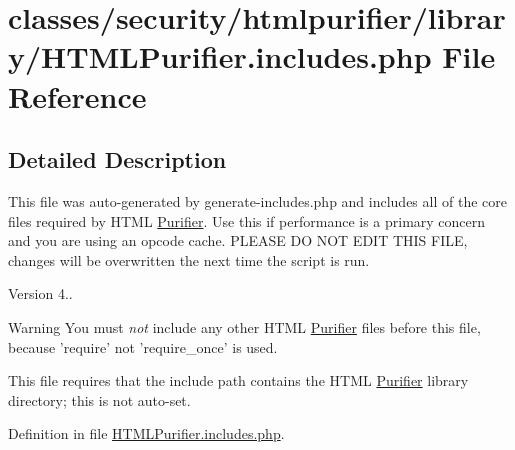 \hypertarget{HTMLPurifier_8includes_8php}{\section{classes/security/htmlpurifier/library/\+H\+T\+M\+L\+Purifier.includes.\+php File Reference}
\label{HTMLPurifier_8includes_8php}
}


\subsection{Detailed Description}
This file was auto-\/generated by generate-\/includes.\+php and includes all of the core files required by H\+T\+M\+L \hyperlink{classPurifier}{Purifier}. Use this if performance is a primary concern and you are using an opcode cache. P\+L\+E\+A\+S\+E D\+O N\+O\+T E\+D\+I\+T T\+H\+I\+S F\+I\+L\+E, changes will be overwritten the next time the script is run.

\begin{DoxyVersion}{Version}
4..
\end{DoxyVersion}
\begin{DoxyWarning}{Warning}
You must {\itshape not} include any other H\+T\+M\+L \hyperlink{classPurifier}{Purifier} files before this file, because 'require' not 'require\+\_\+once' is used.

This file requires that the include path contains the H\+T\+M\+L \hyperlink{classPurifier}{Purifier} library directory; this is not auto-\/set. 
\end{DoxyWarning}


Definition in file \hyperlink{HTMLPurifier_8includes_8php_source}{H\+T\+M\+L\+Purifier.\+includes.\+php}.

